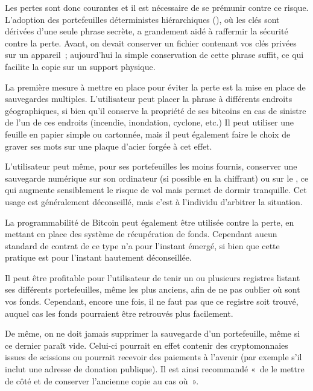 
Les pertes sont donc courantes et il est nécessaire de se prémunir contre ce risque. L'adoption des portefeuilles déterministes hiérarchiques (), où les clés sont dérivées d'une seule phrase secrète, a grandement aidé à raffermir la sécurité contre la perte. Avant, on devait conserver un fichier contenant vos clés privées sur un appareil~; aujourd'hui la simple conservation de cette phrase suffit, ce qui facilite la copie sur un support physique. 

La première mesure à mettre en place pour éviter la perte est la mise en place de sauvegardes multiples. L'utilisateur peut placer la phrase à différents endroits géographiques, si bien qu'il conserve la propriété de ses bitcoins en cas de sinistre de l'un de ces endroits (incendie, inondation, cyclone, etc.)  Il peut utiliser une feuille en papier simple ou cartonnée, mais il peut également faire le choix de graver ses mots sur une plaque d'acier forgée à cet effet.

L'utilisateur peut même, pour ses portefeuilles les moins fournis, conserver une sauvegarde numérique sur son ordinateur (si possible en la chiffrant) ou sur le , ce qui augmente sensiblement le risque de vol mais permet de dormir tranquille. Cet usage est généralement déconseillé, mais c'est à l'individu d'arbitrer la situation.

La programmabilité de Bitcoin peut également être utilisée contre la perte, en mettant en place des système de récupération de fonds. Cependant aucun standard de contrat de ce type n'a pour l'instant émergé, si bien que cette pratique est pour l'instant hautement déconseillée.

Il peut être profitable pour l'utilisateur de tenir un ou plusieurs registres listant ses différents portefeuilles, même les plus anciens, afin de ne pas oublier où sont vos fonds. Cependant, encore une fois, il ne faut pas que ce registre soit trouvé, auquel cas les fonds pourraient être retrouvés plus facilement.

De même, on ne doit jamais supprimer la sauvegarde d'un portefeuille, même si ce dernier paraît vide. Celui-ci pourrait en effet contenir des cryptomonnaies issues de scissions ou pourrait recevoir des paiements à l'avenir (par exemple s'il inclut une adresse de donation publique). Il est ainsi recommandé «~de le mettre de côté et de conserver l'ancienne copie au cas où~».


